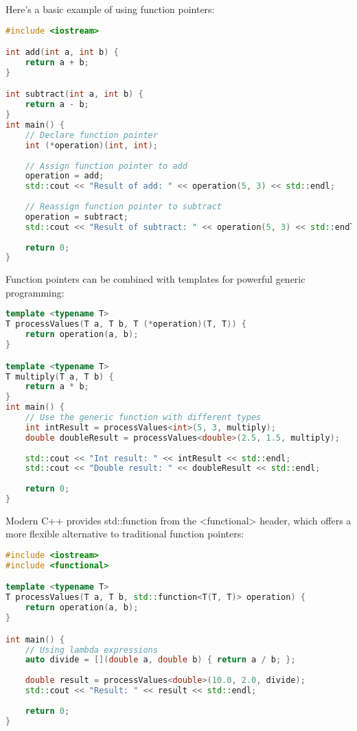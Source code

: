 Here's a basic example of using function pointers:

\begin{lstlisting}[language=C++]
#include <iostream>

int add(int a, int b) {
    return a + b;
}

int subtract(int a, int b) {
    return a - b;
}
int main() {
    // Declare function pointer
    int (*operation)(int, int);
    
    // Assign function pointer to add
    operation = add;
    std::cout << "Result of add: " << operation(5, 3) << std::endl;
    
    // Reassign function pointer to subtract
    operation = subtract;
    std::cout << "Result of subtract: " << operation(5, 3) << std::endl;
    
    return 0;
}
\end{lstlisting}

Function pointers can be combined with templates for powerful generic programming:

\begin{lstlisting}[language=C++]
template <typename T>
T processValues(T a, T b, T (*operation)(T, T)) {
    return operation(a, b);
}

template <typename T>
T multiply(T a, T b) {
    return a * b;
}
int main() {
    // Use the generic function with different types
    int intResult = processValues<int>(5, 3, multiply);
    double doubleResult = processValues<double>(2.5, 1.5, multiply);
    
    std::cout << "Int result: " << intResult << std::endl;
    std::cout << "Double result: " << doubleResult << std::endl;
    
    return 0;
}
\end{lstlisting}

Modern C++ provides std::function from the <functional> header, which offers a more flexible alternative to traditional function pointers:

\begin{lstlisting}[language=C++]
#include <iostream>
#include <functional>

template <typename T>
T processValues(T a, T b, std::function<T(T, T)> operation) {
    return operation(a, b);
}

int main() {
    // Using lambda expressions
    auto divide = [](double a, double b) { return a / b; };
    
    double result = processValues<double>(10.0, 2.0, divide);
    std::cout << "Result: " << result << std::endl;
    
    return 0;
}
\end{lstlisting}